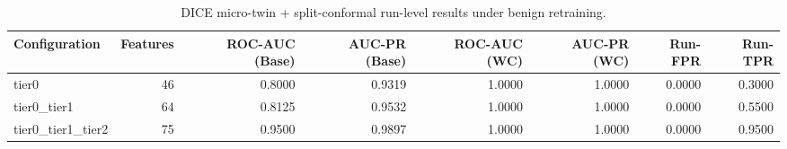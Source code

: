 \begin{table}[t]
\centering
\caption{DICE micro-twin + split-conformal run-level results under benign retraining.}
\label{tab:dice_full_overall}
\footnotesize
\begin{tabular}{lrrrrrrr}
\toprule
Configuration & Features & ROC-AUC (Base) & AUC-PR (Base) & ROC-AUC (WC) & AUC-PR (WC) & Run-FPR & Run-TPR \\
\midrule
tier0 & 46 & 0.8000 & 0.9319 & 1.0000 & 1.0000 & 0.0000 & 0.3000 \\
tier0_tier1 & 64 & 0.8125 & 0.9532 & 1.0000 & 1.0000 & 0.0000 & 0.5500 \\
tier0_tier1_tier2 & 75 & 0.9500 & 0.9897 & 1.0000 & 1.0000 & 0.0000 & 0.9500 \\
\bottomrule
\end{tabular}

\end{table}
